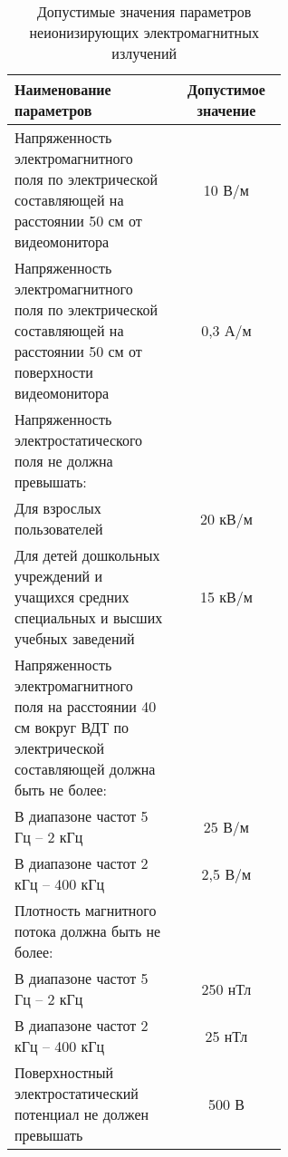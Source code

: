 \documentclass[12pt,a4paper]{report}
\begin{document}
\begin{table} [H]
\label{tabular:micro1}
\begin{center}
\begin{tabular}{|p{0.6\linewidth}|c||}
\hline
Наименование параметров & Допустимое значение \\
\hline
Напряженность электромагнитного поля по электрической составляющей на расстоянии 50 см от видеомонитора	& 10 В/м \\
\hline
Напряженность электромагнитного поля по электрической составляющей на расстоянии 50 см от поверхности видеомонитора	& 0,3 А/м \\
\hline
Напряженность электростатического поля не должна превышать:	& \\
\hline
	Для взрослых пользователей	& 20 кВ/м \\
\hline
	Для детей дошкольных учреждений и учащихся средних специальных и высших учебных заведений & 15 кВ/м \\
\hline
Напряженность электромагнитного поля на расстоянии 40 см вокруг ВДТ по электрической составляющей должна быть не более:	& \\
\hline
	В диапазоне частот 5 Гц – 2 кГц	& 25 В/м \\
\hline
	В диапазоне частот 2 кГц – 400 кГц	& 2,5 В/м \\
\hline
Плотность магнитного потока должна быть не более: & \\
\hline
	В диапазоне частот 5 Гц – 2 кГц	& 250 нТл \\
\hline
	В диапазоне частот 2 кГц – 400 кГц	& 25 нТл \\
\hline
Поверхностный электростатический потенциал не должен превышать & 500 В \\
\hline
\end{tabular}
\end{center}
\caption{Допустимые значения параметров неионизирующих электромагнитных излучений}
\end{table}
\end{document}
